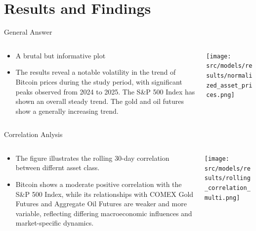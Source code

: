 \section{Results and Findings}
    \begin{frame}{General Answer}
        \begin{columns}
        \begin{column}{0.5\textwidth}
        \begin{itemize}
            \item<1-> A brutal but informative plot
            \item<2->The results reveal a notable volatility in the trend of Bitcoin prices during the study period, with significant peaks observed from 2024 to 2025. The S\&P 500 Index has shown an overall steady trend. The gold and oil futures show a generally increasing trend.
            
        \end{itemize}
        \end{column}
        \begin{column}{0.5\textwidth}  %
            \begin{center}
             \texttt{[image: src/models/results/normalized\_asset\_prices.png]}
             \end{center}
        \end{column}
        \end{columns}
    \end{frame}

    \begin{frame}{Correlation Anlysis}
        \begin{columns}
        \begin{column}{0.5\textwidth}
        \begin{itemize}
            \item<1-> The figure illustrates the rolling 30-day correlation between differnt asset class.
            \item<2-> Bitcoin shows a moderate positive correlation with the S\&P 500 Index, while its relationships with COMEX Gold Futures and Aggregate Oil Futures are weaker and more variable, reflecting differing macroeconomic influences and market-specific dynamics.
           
        \end{itemize}
        \end{column}
        \begin{column}{0.6\textwidth}  %
            \begin{center}
             \texttt{[image: src/models/results/rolling\_correlation\_multi.png]}
             \end{center}
        \end{column}
        \end{columns}
    \end{frame}

